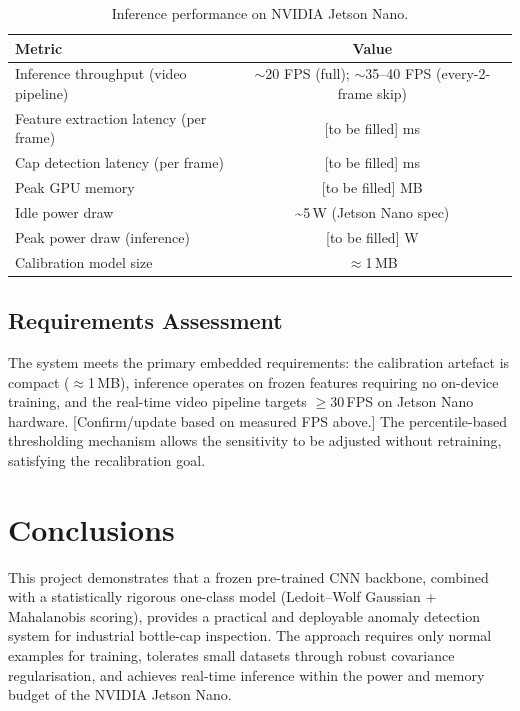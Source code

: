\begin{table}[h]
\centering
\caption{Inference performance on NVIDIA Jetson Nano.}
\label{tab:embedded}
\small
\begin{tabular}{lc}
\hline
\textbf{Metric} & \textbf{Value} \\
\hline
Inference throughput (video pipeline) & $\sim$20 FPS (full); $\sim$35--40 FPS (every-2-frame skip) \\
Feature extraction latency (per frame) & [to be filled] ms \\
Cap detection latency (per frame)      & [to be filled] ms \\
Peak GPU memory                        & [to be filled] MB \\
Idle power draw                        & \textasciitilde5\,W (Jetson Nano spec) \\
Peak power draw (inference)            & [to be filled] W \\
Calibration model size                 & $\approx$1\,MB \\
\hline
\end{tabular}
\end{table}

\subsection{Requirements Assessment}

The system meets the primary embedded requirements: the calibration artefact
is compact ($\approx$1\,MB), inference operates on frozen features requiring
no on-device training, and the real-time video pipeline targets
$\geq$30\,FPS on Jetson Nano hardware. [Confirm/update based on measured FPS
above.] The percentile-based thresholding mechanism allows the sensitivity
to be adjusted without retraining, satisfying the recalibration goal.

\section{Conclusions}

This project demonstrates that a frozen pre-trained CNN backbone, combined
with a statistically rigorous one-class model (Ledoit--Wolf Gaussian +
Mahalanobis scoring), provides a practical and deployable anomaly detection
system for industrial bottle-cap inspection. The approach requires only
normal examples for training, tolerates small datasets through robust
covariance regularisation, and achieves real-time inference within the power
and memory budget of the NVIDIA Jetson Nano.

